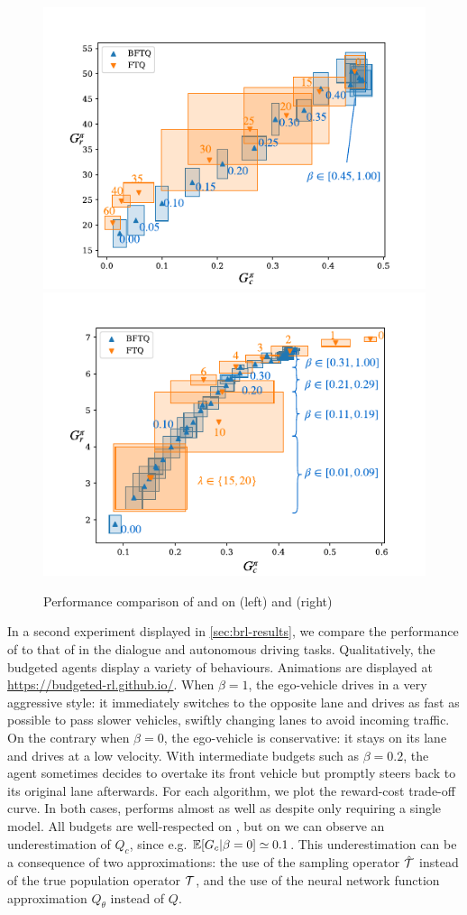\begin{figure}[tp]
	\begin{center}
		\includegraphics[width=0.49\linewidth]{img/slot-filling}
		\includegraphics[width=0.49\linewidth]{img/highway}
		\caption{Performance comparison of \FTQl and \BFTQ on  (left) and (right) }
		\label{sec:brl-results}
	\end{center}
\end{figure}

In a second experiment displayed in \autoref{sec:brl-results}, we compare the performance of \FTQl to that of \BFTQ in the dialogue and autonomous driving tasks. 
Qualitatively, the budgeted agents display a variety of behaviours. Animations are displayed at  \href{https://budgeted-rl.github.io/\#driving-styles}{https://budgeted-rl.github.io/}. When $\beta = 1$, the ego-vehicle drives in a very aggressive style: it immediately switches to the opposite lane and drives as fast as possible to pass slower vehicles, swiftly changing lanes to avoid incoming traffic. On the contrary when $\beta = 0$, the ego-vehicle is conservative: it stays on its lane and drives at a low velocity. With intermediate budgets such as $\beta = 0.2$, the agent sometimes decides to overtake its front vehicle but promptly steers back to its original lane afterwards.
For each algorithm, we plot the reward-cost trade-off curve. In both cases, \BFTQ performs almost as well as \FTQl despite only requiring a single model. All budgets are well-respected on , but on  we can observe an underestimation of $Q_c$, since e.g. $\operatorname*{\mathbb{E}}[G_c|\beta=0] \simeq 0.1 $. This underestimation can be a consequence of two approximations: the use of the sampling operator $\hat{\mathcal{T}}$ instead of the true population operator $\mathcal{T}$, and the use of the neural network function approximation $Q_\theta$ instead of $Q$. 


